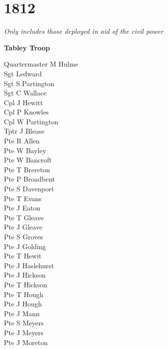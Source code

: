\chapter*{1812}

\vspace*{10mm}

\begin{center}
  \textit{Only includes those deployed in aid of the civil power}
\end{center}

\vspace*{10mm}

\begin{center}
  \Large
  \textbf{Tabley Troop}
\end{center}

\begin{multicols}{3}
  \small
  \noindent
  Quartermaster M Hulme \\
  Sgt Ledward \\
  Sgt S Partington \\
  Sgt C Wallace \\
  Cpl J Hewitt \\
  Cpl P Knowles \\
  Cpl W Partington \\
  Tptr J Blease \\
  Pte R Allen \\
  Pte W Bayley \\
  Pte W Bancroft \\
  Pte T Brereton \\
  Pte P Broadbent \\
  Pte S Davenport \\
  Pte T Evans \\
  Pte J Eaton \\
  Pte T Gleave \\
  Pte J Gleave \\
  Pte S Groves \\
  Pte J Golding \\
  Pte T Hewit \\
  Pte J Haslehurst \\
  Pte J Hickson \\
  Pte T Hickson \\
  Pte T Hough \\
  Pte J Hough \\
  Pte J Mann \\
  Pte S Meyers \\
  Pte J Meyers \\
  Pte J Moreton \\

\end{multicols}
